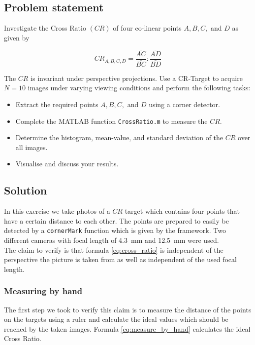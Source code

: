 \documentclass[
a4paper,     %
12pt         %
]{scrartcl}  %
\begin{document}
\subsection{Problem statement}

Investigate the Cross Ratio $(CR)$ of four co-linear points $A, B, C,$ and $D$ as given by

\begin{equation}
 CR_{A,B,C,D} = \frac{\overline{AC}}{\overline{BC}} : \frac{\overline{AD}}{\overline{BD}}
 \label{eq:cross_ratio}
\end{equation}

The $CR$ is invariant under perspective projections. Use a CR-Target to acquire $N = 10$ images under varying
viewing conditions and perform the following tasks:

\begin{itemize}
 \item Extract the required points $A, B, C,$ and $D$ using a corner detector.
 \item Complete the MATLAB function \texttt{CrossRatio.m} to measure the $CR$.
 \item Determine the histogram, mean-value, and standard deviation of the $CR$ over all images.
 \item Visualise and discuss your results.
\end{itemize}


\subsection{Solution}

In this exercise we take photos of a $CR$-target which contains four points that have a certain distance to each other.
The points are prepared to easily be detected by a \lstinline{cornerMark} function which is given by the framework.
Two different cameras with focal length of \SI{4.3}{mm} and \SI{12.5}{mm} were used.
\\
The claim to verify is that formula \ref{eq:cross_ratio} is independent of the perspective the picture is taken from as well as independent of the used focal length.

\subsubsection{Measuring by hand}

The first step we took to verify this claim is to measure the distance of the points on the targets using a ruler and calculate the ideal values which should be reached by the taken images.
Formula \ref{eq:measure_by_hand} calculates the ideal Cross Ratio.
\end{document}

